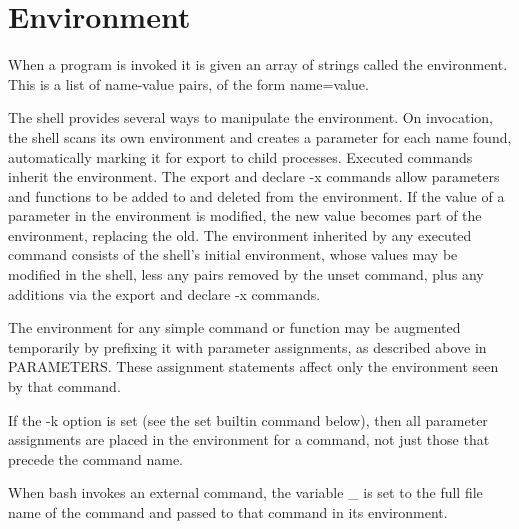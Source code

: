 \section{Environment}\label{sec:environment}
When a program is invoked it is given an array of strings called the environment. This is a list of name-value pairs, of the form name=value.

The shell provides several ways to manipulate the environment. On invocation, the shell scans its own environment and creates a parameter for each name found, automatically marking it for export to child processes. Executed commands inherit the environment. The export and declare -x commands allow parameters and functions to be added to and deleted from the environment. If the value of a parameter in the environment is modified, the new value becomes part of the environment, replacing the old. The environment inherited by any executed command consists of the shell's initial environment, whose values may be modified in the shell, less any pairs removed by the unset command, plus any additions via the export and declare -x commands.

The environment for any simple command or function may be augmented temporarily by prefixing it with parameter assignments, as described above in PARAMETERS. These assignment statements affect only the environment seen by that command.

If the -k option is set (see the set builtin command below), then all parameter assignments are placed in the environment for a command, not just those that precede the command name.

When bash invokes an external command, the variable \_ is set to the full file name of the command and passed to that command in its environment.
